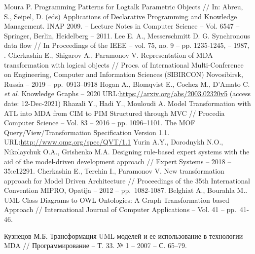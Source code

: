 \documentclass[12pt]{article}
\begin{document}
\begin{thebibliography}{99}
Moura P. Programming Patterns for Logtalk Parametric Objects // In: Abreu, S., Seipel, D. (eds) Applications of Declarative Programming and Knowledge Management. INAP 2009. -- Lecture Notes in Computer Science -- Vol. 6547 -- Springer, Berlin, Heidelberg -- 2011. 
Lee E. A., Messerschmitt D. G. Synchronous data flow // In Proceedings of the IEEE -- vol. 75, no. 9 -- pp. 1235-1245, -- 1987, .
 Cherkashin E., Shigarov A., Paramonov V. Representation of MDA transformation with logical objects // Procs. of International Multi-Conference on Engineering, Computer and Information Sciences (SIBIRCON) Novosibirsk, Russia -- 2019 -- pp.~0913--0918 
 Hogan A., Blomqvist E., Cochez M., D’Amato C. \emph{et al}. Knowledge Graphs -- 2020 URL:\url{https://arxiv.org/abs/2003.02320v5} (access date: 12-Dec-2021)
Rhazali Y., Hadi Y., Mouloudi A. Model Transformation with ATL into MDA from CIM to PIM Structured through MVC // Procedia Computer Science -- Vol. 83 -- 2016 -- pp. 1096–1101. 
 The MOF Query/View/Transformation Specification Version 1.1. URL:\url{http://www.omg.org/spec/QVT/1.1}
 Yurin A.Y., Dorodnykh N.O., Nikolaychuk O.A., Grishenko M.A. Designing rule-based expert systems with the aid of the model-driven development approach // Expert Systems -- 2018 -- 35:e12291. 
 Cherkashin E., Terehin I., Paramonov V. New transformation approach for Model Driven Architecture // Proceedings of the 35th International Convention MIPRO, Opatija -- 2012 -- pp.~1082-1087.
 Belghiat A., Bourahla M.. UML Class Diagrams to OWL Ontologies: A Graph Transformation based Approach // International Journal of Computer Applications -- Vol. 41 -- pp.~41-46.

Кузнецов М.Б. Трансформация UML-моделей и ее использование в технологии MDA // Программирование -- Т. 33. № 1 -- 2007 -- С. 65--79.



\end{thebibliography}
\end{document}
